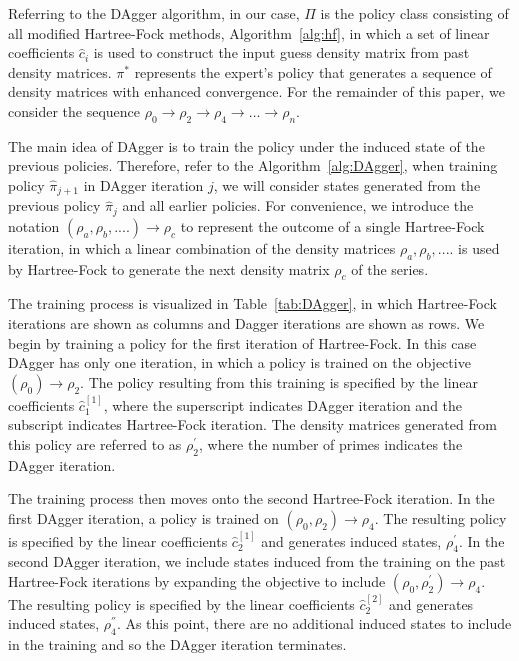 \documentclass[twoside,11pt]{article}
\begin{document}
Referring to the DAgger algorithm, in our case, $\Pi$ is the policy class consisting of all modified Hartree-Fock methods, Algorithm~\ref{alg:hf}, in which a set of linear coefficients $\hat{c}_i$ is used to construct the input guess density matrix from past density matrices. $\pi^*$ represents the expert's policy that generates a sequence of density matrices with enhanced convergence. For the remainder of this paper, we consider the sequence $\rho_0 \rightarrow \rho_2 \rightarrow  \rho_4 \rightarrow  \ldots \rightarrow  \rho_{n}$. 


The main idea of DAgger is to train the policy under the induced state of the previous policies. Therefore, refer to the Algorithm~\ref{alg:DAgger}, when training policy $\hat{\pi}_{j+1}$ in DAgger iteration $j$, we will consider states generated from the previous policy $\hat{\pi}_{j}$ and all earlier policies. For convenience, we introduce the notation $(\rho_a, \rho_b, ....) \rightarrow \rho_c $ to represent the outcome of a single Hartree-Fock iteration, in which a linear combination of the density matrices $\rho_a, \rho_b, ....$ is used by Hartree-Fock to generate the next density matrix $\rho_c$ of the series. 

The training process is visualized in Table~\ref{tab:DAgger}, in which Hartree-Fock iterations are shown as columns and Dagger iterations are shown as rows. We begin by training a policy for the first iteration of Hartree-Fock. In this case DAgger has only one iteration, in which a policy is trained on the objective $(\rho_0) \rightarrow \rho_2$. The policy resulting from this training is specified by the linear coefficients $\hat{c}^{[1]}_1$, where the superscript indicates DAgger iteration and the subscript indicates Hartree-Fock iteration. The density matrices generated from this policy are referred to as $\rho_2^{'}$, where the number of primes indicates the DAgger iteration. 

The training process then moves onto the second Hartree-Fock iteration. In the first DAgger iteration, a policy is trained on $(\rho_0, \rho_2) \rightarrow \rho_4$. The resulting policy is specified by the linear coefficients $\hat{c}^{[1]}_2$ and generates induced states, $\rho_4^{'}$. In the second DAgger iteration, we include states induced from the training on the past Hartree-Fock iterations by expanding the objective to include $(\rho_0, \rho_2^{'}) \rightarrow \rho_4$. The resulting policy is specified by the linear coefficients $\hat{c}^{[2]}_2$ and generates induced states, $\rho_4^{''}$. As this point, there are no additional induced states to include in the training and so the DAgger iteration terminates. 
\end{document}
